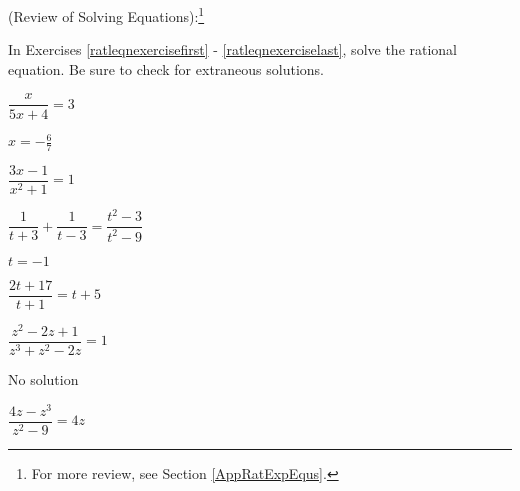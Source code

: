 \documentclass{ximera}
\begin{document}
	\author{Stitz-Zeager}


\begin{question}
(Review of Solving Equations):\footnote{For more review, see Section \ref{AppRatExpEqus}.} 

In Exercises \ref{ratleqnexercisefirst} - \ref{ratleqnexerciselast},  solve the rational equation.  Be sure to check for extraneous solutions.

\begin{problem}\label{ratleqnexercisefirst}
$\dfrac{x}{5x + 4} = 3$ 

\begin{solution}
$x = -\frac{6}{7}$
\end{solution}
\end{problem}

\begin{problem}
$\dfrac{3x - 1}{x^{2} + 1} = 1$ 
\end{problem} 

\begin{problem}
$\dfrac{1}{t + 3} + \dfrac{1}{t - 3} = \dfrac{t^{2} - 3}{t^{2} - 9}$ 

\begin{solution}
$t = -1$
\end{solution}
\end{problem} 

\begin{problem}
$\dfrac{2t + 17}{t + 1} = t + 5$ 
\end{problem}  

\begin{problem}
$\dfrac{z^{2} - 2z + 1}{z^{3} + z^{2} - 2z} = 1$ 

\begin{solution}
No solution
\end{solution}
\end{problem}   

\begin{problem}\label{ratleqnexerciselast}
$\dfrac{4z- z^3}{z^{2} - 9} = 4z$  
\end{problem}  

\end{question}
\end{document}
